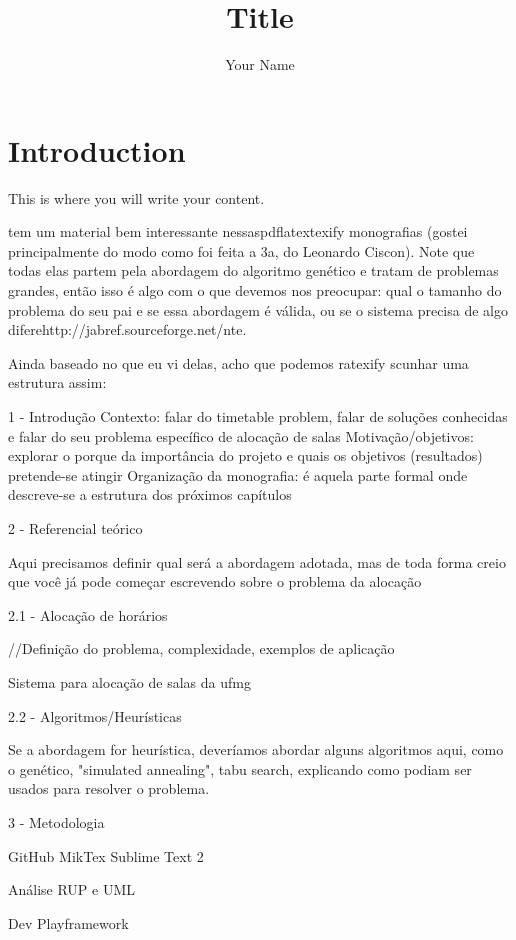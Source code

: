 \documentclass{article}
\title{Title}
\author{Your Name}
\begin{document}
 
\maketitle{}
 
\section{Introduction}
 
This is where you will write your content.
 



tem um material bem interessante nessaspdflatextexify  monografias (gostei
principalmente do modo como foi feita a 3a, do Leonardo Ciscon). Note
que todas elas partem pela abordagem do algoritmo genético e tratam de
problemas grandes, então isso é algo com o que devemos nos preocupar:
qual o tamanho do problema do seu pai e se essa abordagem é válida, ou
se o sistema precisa de algo diferehttp://jabref.sourceforge.net/nte.

Ainda baseado no que eu vi delas, acho que podemos ratexify scunhar uma
estrutura assim:


1 - Introdução
Contexto: falar do timetable problem, falar de soluções conhecidas e
falar do seu problema específico de alocação de salas
Motivação/objetivos: explorar o porque da importância do projeto e
quais os objetivos (resultados) pretende-se atingir
Organização da monografia: é aquela parte formal onde descreve-se a
estrutura dos próximos capítulos

2 - Referencial teórico

Aqui precisamos definir qual será a abordagem adotada, mas de toda
forma creio que você já pode começar escrevendo sobre o problema da
alocação


2.1 - Alocação de horários

//Definição do problema, complexidade, exemplos de aplicação

Sistema para alocação de salas da ufmg


2.2 - Algoritmos/Heurísticas

Se a abordagem for heurística, deveríamos abordar alguns algoritmos
aqui, como o genético, "simulated annealing", tabu search, explicando
como podiam ser usados para resolver o problema.

3 - Metodologia

GitHub
MikTex
Sublime Text 2

Análise
RUP e UML

Dev
Playframework
\end{document}
